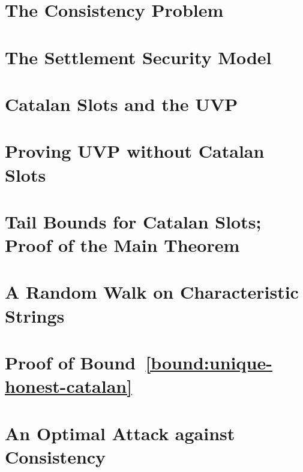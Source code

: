 




\chapter{The Consistency Problem}\label{sec:intro-multihonest}


\chapter{The Settlement Security Model}\label{sec:model-multihonest}


\chapter{Catalan Slots and the UVP}\label{sec:catalan}\label{sec:definitions-multihonest}





\chapter{Proving UVP without Catalan Slots}\label{sec:fork-framework}



\chapter{Tail Bounds for Catalan Slots; Proof of the Main Theorem}\label{sec:bounds-main-proofs-multihonest}


\chapter{A Random Walk on Characteristic Strings}\label{sec:rand-walks}
 


\chapter[Proving the Tail Bound]{Proof of \texorpdfstring{Bound~\ref{bound:unique-honest-catalan}}{the First Tail Bound} }\label{sec:estimates-multihonest}



\chapter{An Optimal Attack against Consistency}\label{sec:opt-adversary}



